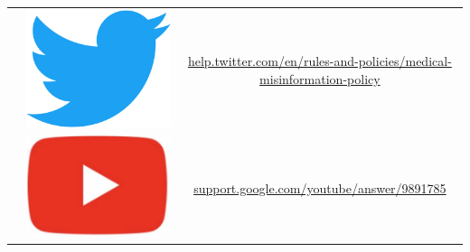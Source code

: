 \documentclass{article}
\begin{document}
\begin{table}[h]
\begin{tabular}{|c|c|c|}
                                           & \includegraphics[scale=0.007]{./img/tw_logo.png}   & \href{https://help.twitter.com/en/rules-and-policies/medical-misinformation-policy}{help.twitter.com/en/rules-and-policies/medical-misinformation-policy}       \\ \cline{2-3} 
                                           & \includegraphics[scale=0.03]{./img/yt_logo.png}  & \href{https://support.google.com/youtube/answer/9891785}{support.google.com/youtube/answer/9891785}                                 \\ \hline

\end{tabular}
\end{table}
\end{document}
